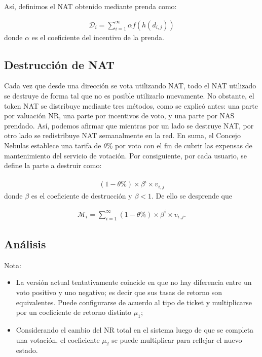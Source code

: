 Así, definimos el NAT obtenido mediante prenda como:

\begin{align}
\mathcal{D}_i = \sum_{i=1}^{\infty}\alpha f(h(d_{i,j}))
\end{align}
\noindent donde $\alpha$ es el coeficiente del incentivo de la prenda.


\subsection{Destrucción de NAT}

\label{burn}

Cada vez que desde una dirección se vota utilizando NAT, todo el NAT utilizado se destruye de forma tal que no es posible utilizarlo nuevamente. No obstante, el token NAT se distribuye mediante tres métodos, como se explicó antes: una parte por valuación NR, una parte por incentivos de voto, y una parte por NAS prendado. Así, podemos afirmar que mientras por un lado se destruye NAT, por otro lado se redistribuye NAT semanalmente en la red. En suma, el Concejo Nebulas establece una tarifa de $\theta\%$ por voto con el fin de cubrir las expensas de mantenimiento del servicio de votación. Por consiguiente, por cada usuario, se define la parte a destruir como:

\begin{align}
	(1-\theta\%) \times \beta^i \times v_{i,j}
\end{align}
\noindent donde $\beta$ es el coeficiente de destrucción y $\beta < 1$. De ello se desprende que

\begin{align}
	\mathcal{M}_i = \sum_{i=1}^{\infty} (1-\theta\%) \times \beta^i \times v_{i,j} .
\end{align}

\subsection{Análisis}

Nota:
\begin{itemize}
\item La versión actual tentativamente coincide en que no hay diferencia entre un voto positivo y uno negativo; es decir que sus tasas de retorno son equivalentes. Puede configurarse de acuerdo al tipo de ticket y multiplicarse por un coeficiente de retorno distinto $\mu_1$;

\item Considerando el cambio del NR total en el sistema luego de que se completa una votación, el coeficiente $\mu_2$ se puede multiplicar para reflejar el nuevo estado.
\end{itemize}

